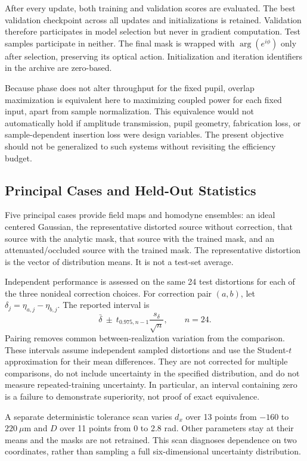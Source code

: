 \documentclass[journal]{IEEEtran}
\begin{document}
After every update, both training and validation scores are evaluated. The best validation checkpoint across all updates and initializations is retained. Validation therefore participates in model selection but never in gradient computation. Test samples participate in neither. The final mask is wrapped with $\arg(e^{i\phi})$ only after selection, preserving its optical action. Initialization and iteration identifiers in the archive are zero-based.

Because phase does not alter throughput for the fixed pupil, overlap maximization is equivalent here to maximizing coupled power for each fixed input, apart from sample normalization. This equivalence would not automatically hold if amplitude transmission, pupil geometry, fabrication loss, or sample-dependent insertion loss were design variables. The present objective should not be generalized to such systems without revisiting the efficiency budget.

\subsection{Principal Cases and Held-Out Statistics}
Five principal cases provide field maps and homodyne ensembles: an ideal centered Gaussian, the representative distorted source without correction, that source with the analytic mask, that source with the trained mask, and an attenuated/occluded source with the trained mask. The representative distortion is the vector of distribution means. It is not a test-set average.

Independent performance is assessed on the same 24 test distortions for each of the three nonideal correction choices. For correction pair $(a,b)$, let $\delta_j=\eta_{a,j}-\eta_{b,j}$. The reported interval is
\begin{equation}
 \bar\delta\ \pm\ t_{0.975,n-1}\frac{s_\delta}{\sqrt n},\qquad n=24.
 \label{eq:paired}
\end{equation}
Pairing removes common between-realization variation from the comparison. These intervals assume independent sampled distortions and use the Student-$t$ approximation for their mean differences. They are not corrected for multiple comparisons, do not include uncertainty in the specified distribution, and do not measure repeated-training uncertainty. In particular, an interval containing zero is a failure to demonstrate superiority, not proof of exact equivalence.

A separate deterministic tolerance scan varies $d_x$ over 13 points from $-160$ to $220~\mu$m and $D$ over 11 points from 0 to 2.8 rad. Other parameters stay at their means and the masks are not retrained. This scan diagnoses dependence on two coordinates, rather than sampling a full six-dimensional uncertainty distribution.
\end{document}
